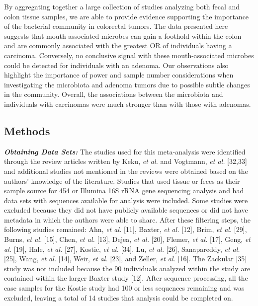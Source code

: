 \documentclass[12pt,]{article}
\begin{document}
By aggregating together a large collection of studies analyzing both
fecal and colon tissue samples, we are able to provide evidence
supporting the importance of the bacterial community in colorectal
tumors. The data presented here suggests that mouth-associated microbes
can gain a foothold within the colon and are commonly associated with
the greatest OR of individuals having a carcinoma. Conversely, no
conclusive signal with these mouth-associated microbes could be detected
for individuals with an adenoma. Our observations also highlight the
importance of power and sample number considerations when investigating
the microbiota and adenoma tumors due to possible subtle changes in the
community. Overall, the associations between the microbiota and
individuals with carcinomas were much stronger than with those with
adenomas.

\newpage

\subsection{Methods}\label{methods}

\textbf{\emph{Obtaining Data Sets:}} The studies used for this
meta-analysis were identified through the review articles written by
Keku, \emph{et al.} and Vogtmann, \emph{et al.} {[}32,33{]} and
additional studies not mentioned in the reviews were obtained based on
the authors' knowledge of the literature. Studies that used tissue or
feces as their sample source for 454 or Illumina 16S rRNA gene
sequencing analysis and had data sets with sequences available for
analysis were included. Some studies were excluded because they did not
have publicly available sequences or did not have metadata in which the
authors were able to share. After these filtering steps, the following
studies remained: Ahn, \emph{et al.} {[}11{]}, Baxter, \emph{et al.}
{[}12{]}, Brim, \emph{et al.} {[}29{]}, Burns, \emph{et al.} {[}15{]},
Chen, \emph{et al.} {[}13{]}, Dejea, \emph{et al.} {[}20{]}, Flemer,
\emph{et al.} {[}17{]}, Geng, \emph{et al.} {[}19{]}, Hale, \emph{et
al.} {[}27{]}, Kostic, \emph{et al.} {[}34{]}, Lu, \emph{et al.}
{[}26{]}, Sanapareddy, \emph{et al.} {[}25{]}, Wang, \emph{et al.}
{[}14{]}, Weir, \emph{et al.} {[}23{]}, and Zeller, \emph{et al.}
{[}16{]}. The Zackular {[}35{]} study was not included because the 90
individuals analyzed within the study are contained within the larger
Baxter study {[}12{]}. After sequence processing, all the case samples
for the Kostic study had 100 or less sequences remaining and was
excluded, leaving a total of 14 studies that analysis could be completed
on.
\end{document}
